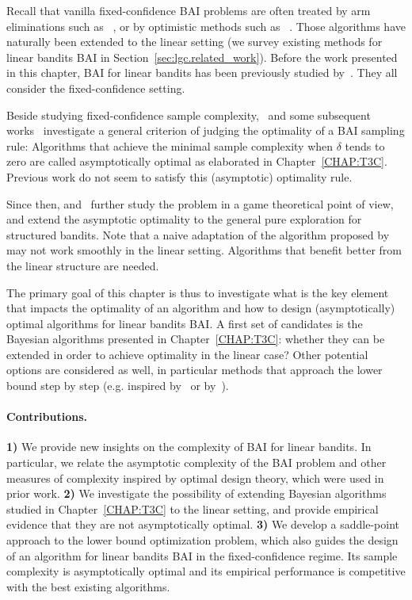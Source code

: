 Recall that vanilla fixed-confidence BAI problems are often treated by arm eliminations such as \SE~\citep{karnin2013sha}, or by optimistic methods such as \UGapE~\citep{gabillon2012ugape}. Those algorithms have naturally been extended to the linear setting (we survey existing methods for linear bandits BAI in Section~\ref{sec:lgc.related_work}). Before the work presented in this chapter, BAI for linear bandits has been previously studied by~\cite{soare2014linear,tao2018alba,xu2018linear,zaki2019maxoverlap,fiez2019transductive,kazerouni2019glb}. They all consider the fixed-confidence setting.

Beside studying fixed-confidence sample complexity,~\citet{garivier2016tracknstop} and some subsequent works~\citep{qin2017ttei,shang2020t3c} investigate a general criterion of judging the optimality of a BAI sampling rule: Algorithms that achieve the minimal sample complexity when $\delta$ tends to zero are called asymptotically optimal as elaborated in Chapter~\ref{CHAP:T3C}. Previous work do not seem to satisfy this (asymptotic) optimality rule.

Since then, \citet{menard2019lma} and~\citet{degenne2019game} further study the problem in a game theoretical point of view, and extend the asymptotic optimality to the general pure exploration for structured bandits. Note that a naive adaptation of the algorithm proposed by~\cite{degenne2019game} may not work smoothly in the linear setting. Algorithms that benefit better from the linear structure are needed.

The primary goal of this chapter is thus to investigate what is the key element that impacts the optimality of an algorithm and how to design (asymptotically) optimal algorithms for linear bandits BAI. A first set of candidates is the Bayesian algorithms presented in Chapter~\ref{CHAP:T3C}: whether they can be extended in order to achieve optimality in the linear case? Other potential options are considered as well, in particular methods that approach the lower bound step by step (e.g. inspired by~\citealt{garivier2016tracknstop} or by~\cite{degenne2019game}).

\paragraph{Contributions.}
\textbf{1)}
We provide new insights on the complexity of BAI for linear bandits. In particular, we relate the asymptotic complexity of the BAI problem and other measures of complexity inspired by optimal design theory, which were used in prior work.
\textbf{2)}
We investigate the possibility of extending Bayesian algorithms studied in Chapter~\ref{CHAP:T3C} to the linear setting, and provide empirical evidence that they are not asymptotically optimal.
\textbf{3)}
We develop a saddle-point approach to the lower bound optimization problem, which also guides the design of an algorithm \LG{} for linear bandits BAI in the fixed-confidence regime. Its sample complexity is asymptotically optimal and its empirical performance is competitive with the best existing algorithms.

%
%
%
